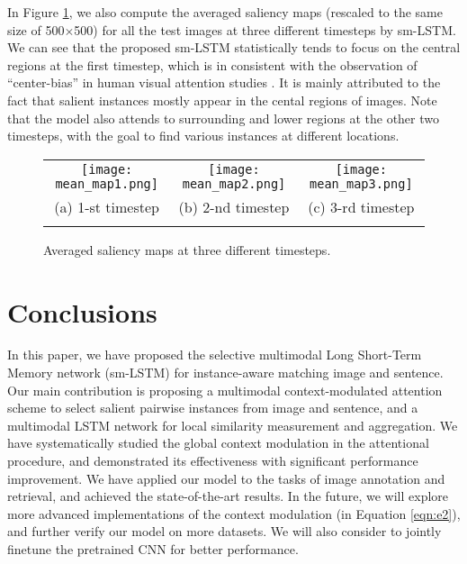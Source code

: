\documentclass[10pt,twocolumn,letterpaper]{article}
\begin{document}
In Figure \ref{figure:mean}, we also compute the averaged saliency maps
(rescaled to the same size of 500$\times$500) for all the test images
at three different timesteps by sm-LSTM.
We can see that the proposed sm-LSTM statistically tends to focus on
the central regions at the first timestep,
which is in consistent with the observation of ``center-bias'' in
human visual attention studies \cite{tseng2009quantifying,bindemann2010scene}.
It is mainly attributed to the fact that salient instances mostly
appear in the cental regions of images.
Note that the model also attends to surrounding and lower regions
at the other two timesteps, with the goal to find various instances at different locations.





\begin{figure}[t]
\addtolength{\tabcolsep}{-2pt}
\centering
\begin{tabular}{ccc}
\texttt{[image: mean\_map1.png]} \hspace{2mm}&\hspace{2mm}
\texttt{[image: mean\_map2.png]} \hspace{2mm}&\hspace{2mm}
\texttt{[image: mean\_map3.png]}\\
(a) 1-st timestep  &  (b) 2-nd timestep &  (c) 3-rd timestep\\
\\
\end{tabular}
\caption{Averaged saliency maps at three different timesteps.}
\label{figure:mean}
\end{figure}


\section{Conclusions}
In this paper, we have proposed the selective multimodal Long Short-Term Memory network (sm-LSTM)
for instance-aware matching image and sentence. Our main contribution is proposing a
multimodal context-modulated attention scheme to select salient pairwise instances
from image and sentence, and a multimodal LSTM network for local similarity measurement and aggregation.
We have systematically studied the global context modulation in
the attentional procedure, and demonstrated its effectiveness with significant performance
improvement.
We have applied our model to the tasks of image annotation and retrieval,
and achieved the state-of-the-art results.
In the future, we will explore more advanced implementations of the context modulation
(in Equation \ref{eqn:e2}), and
further verify our model on more datasets.
We will also consider to jointly finetune the pretrained CNN
for better performance.





{\small


}
\end{document}

